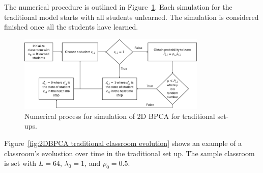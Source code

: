 The numerical procedure is outlined in Figure~\ref{fig:2DBPCA Traditional Flowchart}. Each simulation for the traditional model starts with all students unlearned. The simulation is considered finished once all the students have learned.

\begin{figure}[htbp!]
    \centering
    \includegraphics[width=0.8\textwidth]{figures/2DBPCA TI Flowchart.png}
    \caption[Traditional instruction flowchart]{Numerical process for simulation of 2D BPCA for traditional set-ups.}
    \label{fig:2DBPCA Traditional Flowchart}
\end{figure}

Figure~\ref{fig:2DBPCA traditional classroom evolution} shows an example of a classroom's evolustion over time in the traditional set up. The sample classroom is set with $L=64$, $\lambda_0 = 1$, and $\rho_0 = 0.5$.

